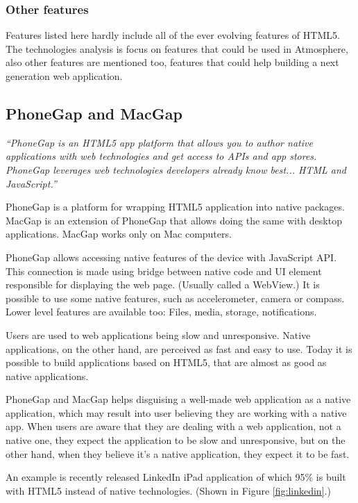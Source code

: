 \subsubsection{Other features}

Features listed here hardly include all of the ever evolving features of HTML5. The technologies analysis is focus on features that could be used in Atmosphere, also other features are mentioned too, features that could help building a next generation web application.

\subsection{PhoneGap and MacGap}

\emph{``PhoneGap is an HTML5 app platform that allows you to author native applications with web technologies and get access to APIs and app stores. PhoneGap leverages web technologies developers already know best... HTML and JavaScript.''} \citep{phonegap}

PhoneGap is a platform for wrapping HTML5 application into native packages. MacGap is an extension of PhoneGap that allows doing the same with desktop applications. MacGap works only on Mac computers.

PhoneGap allows accessing native features of the device with JavaScript API. This connection is made using bridge between native code and UI element responsible for displaying the web page. (Usually called a WebView.) It is possible to use some native features, such as accelerometer, camera or compass. Lower level features are available too: Files, media, storage, notifications. 

Users are used to web applications being slow and unresponsive. Native applications, on the other hand, are perceived as fast and easy to use. Today it is possible to build applications based on HTML5, that are almost as good as native applications.

PhoneGap and MacGap helps disguising a well-made web application as a native application, which may result into user believing they are working with a native app. When users are aware that they are dealing with a web application, not a native one, they expect the application to be slow and unresponsive, but on the other hand, when they believe it's a native application, they expect it to be fast.

An example is recently released LinkedIn iPad application of which 95\% is built with HTML5 instead of native technologies. (Shown in Figure \ref{fig:linkedin}.) \citep{linkedin_ipad}

